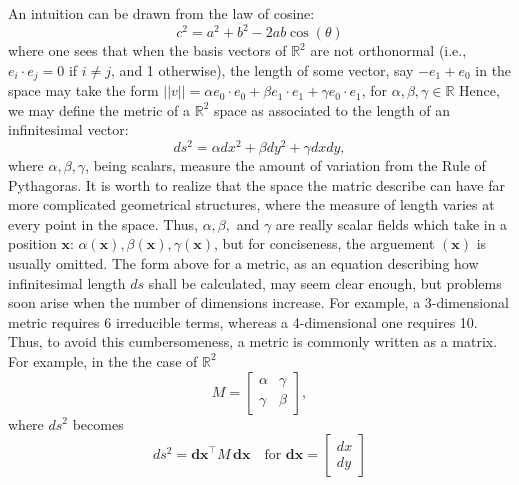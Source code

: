 \documentclass[conference]{IEEEtran}
\begin{document}
An intuition can be drawn from the law of cosine:
\[
c^2 = a^2 + b^2 - 2ab\cos(\theta)
\]
where one sees that when the basis vectors of $\mathbb{R}^2$ are not orthonormal 
(i.e., $e_i \cdot e_j = 0$ if $i \neq  j$, and 1 otherwise), the length of some vector, 
say $-e_1 + e_0$ 
in the space may take the form $||v|| = \alpha e_0 \cdot e_0 + \beta e_1 \cdot e_1 + \gamma e_0 \cdot e_1$,
for $\alpha,\beta,\gamma \in \mathbb{R}$ Hence, we may define the metric 
of a $\mathbb{R}^2$ space as associated to the length of an infinitesimal vector:
\[
ds^2 = \alpha dx^2 + \beta dy^2 + \gamma dxdy,
\]
where $\alpha, \beta, \gamma$, being scalars, measure the amount of variation from the Rule of Pythagoras. 
It is worth to realize that the space the matric describe can have far 
more complicated geometrical structures, where the measure of length varies 
at every point in the space. Thus, $\alpha, \beta,$ and $\gamma$ are really 
scalar fields which take in a position $\mathbf{x}$: $\alpha(\mathbf{x}), \beta(\mathbf{x}),
\gamma(\mathbf{x})$, but for conciseness, the arguement $(\mathbf{x})$ is usually omitted.
The form above for a metric, as an equation describing how infinitesimal length $ds$ shall be calculated, may seem clear enough, but problems soon arise when the number 
of dimensions increase. For example, a 3-dimensional metric requires 6 irreducible terms, 
whereas a 4-dimensional one requires 10. Thus, to avoid this cumbersomeness,
a metric is commonly written as a matrix. For example, in the the case of $\mathbb{R}^2$
\[
M =
\begin{bmatrix}
\alpha & \gamma \\
\gamma & \beta
\end{bmatrix},
\]
where $ds^2$ becomes
\[
ds^2 = \mathbf{dx}^\top M \, \mathbf{dx}
\quad \text{for } \mathbf{dx} = \begin{bmatrix} dx \\ dy \end{bmatrix}
\tag{1}
\]
\end{document}
